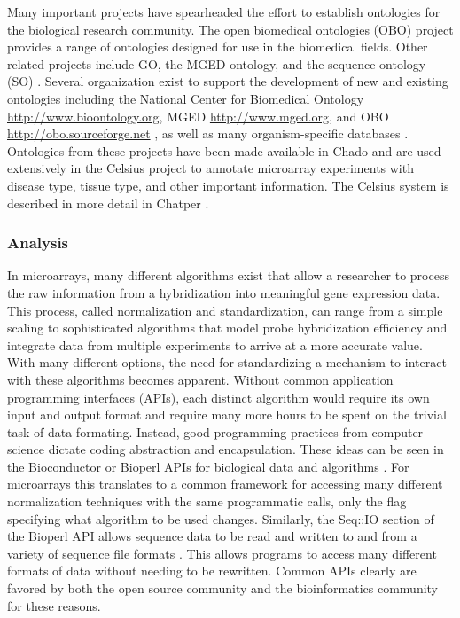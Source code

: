 Many important projects have spearheaded the effort to establish ontologies for
the biological research community.  The open biomedical ontologies (OBO)
project provides a range of ontologies designed for use in the biomedical
fields.  Other related projects include GO, the MGED ontology, and the sequence
ontology (SO) \cite{mo,go,so}.  Several organization exist to support the
development of new and existing ontologies including the National Center for
Biomedical Ontology \url{http://www.bioontology.org}, MGED
\url{http://www.mged.org}, and OBO \url{http://obo.sourceforge.net}
\cite{ncbo,obo}, as well as many organism-specific databases
\cite{flybase,wormbase,sgd}.  Ontologies from these projects have been made
available in Chado and are used extensively in the Celsius project to annotate
microarray experiments with disease type, tissue type, and other important
information.  The Celsius system is described in more detail in Chatper
\celsiuschapter.


\subsubsection{Analysis}

In microarrays, many different algorithms exist that allow a researcher to
process the raw information from a hybridization into meaningful gene
expression data.  This process, called normalization and standardization, can
range from a simple scaling to sophisticated algorithms that model probe
hybridization efficiency and integrate data from multiple experiments to arrive
at a more accurate value. With many different options, the need for
standardizing a mechanism to interact with these algorithms becomes apparent.
Without common application programming interfaces (APIs), each distinct
algorithm would require its own input and output format and require many more
hours to be spent on the trivial task of data formating.  Instead, good
programming practices from computer science dictate coding abstraction and
encapsulation.  These ideas can be seen in the Bioconductor or Bioperl APIs for
biological data and algorithms \cite{bioperl,bioc}.  For
microarrays this translates to a common framework for accessing many different
normalization techniques with the same programmatic calls, only the flag
specifying what algorithm to be used changes.  Similarly, the Seq::IO section
of the Bioperl API allows sequence data to be read and written to and from a
variety of sequence file formats \cite{bioperl}.  This allows programs
to access many different formats of data without needing to be rewritten.
Common APIs clearly are favored by both the open source community and the
bioinformatics community for these reasons.

